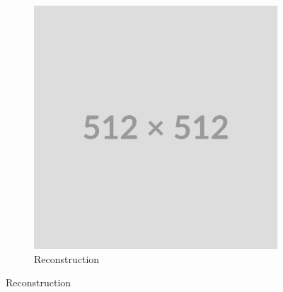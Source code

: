 \begin{figure}
\begin{subfigure}[b]{0.4\textwidth}
        \includegraphics[width=\textwidth]{img/placeholder512.png}
        \caption{Reconstruction}
        \label{fig:fft-64-full-45}
    \end{subfigure}
    

\end{figure}
